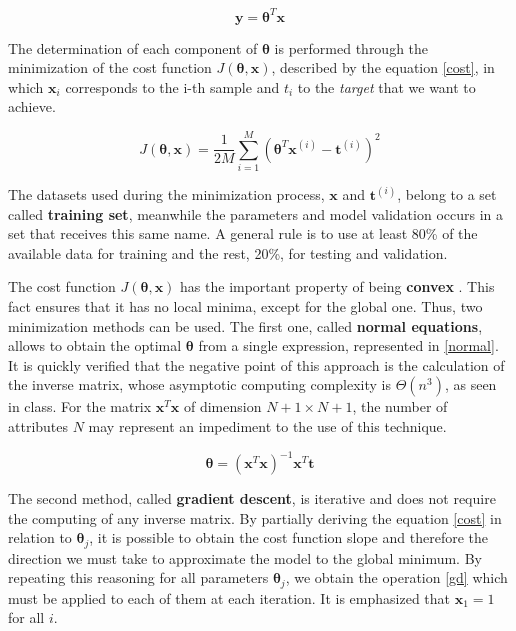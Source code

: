 \documentclass[10pt,twocolumn,letterpaper]{article}
\begin{document}
\begin{equation}
\label {lr}
\bm{y} = \bm{\theta}^T\bm{x}
\end{equation}

The determination of each component of \(\bm{\theta}\) is performed through the minimization of the cost function \(J(\bm{\theta}, \bm{x})\), described by the equation \ref{cost}, in which \(\bm{x}_ i\) corresponds to the i-th sample and \(t_ i\) to the \textit{target} that we want to achieve.

\begin{equation}
\label {cost}
J(\bm{\theta}, \bm{x}) = \frac{1}{2M} \displaystyle\sum_{i=1}^{M} \left(\bm{\theta}^T\bm{x}^{(i)} - \bm{t}^{(i)}\right)^2
\end{equation}

The datasets used during the minimization process,  \(\bm{x}\) and \(\bm{t}^{(i)}\), belong to a set called \textbf{training set}, meanwhile the parameters and model validation occurs in a set that receives this same name. A general rule is to use at least 80\% of the available data for training and the rest, 20\%, for testing and validation.

The cost function \(J(\bm{\theta}, \bm{x})\) has the important property of being  \textbf{convex} \cite{Bishop:2006:PRM:1162264}. This fact ensures that it has no local minima, except for the global one. Thus, two minimization methods can be used. The first one, called \textbf{normal equations},  allows to obtain the optimal \(\bm{\theta}\)  from a single expression, represented in \ref{normal}. It is quickly verified that the negative point of this approach is the calculation of the inverse matrix, whose asymptotic computing complexity is \(\Theta(n^3)\), as seen in class. For the matrix \(\bm{x}^T\bm{x}\) of dimension \(N+1 \times N+1 \), the number of attributes \(N\) may represent an impediment to the use of this technique.

\begin{equation}
\label {normal}
\bm{\theta} = \left(\bm{x}^T\bm{x}\right)^{-1} \bm{x}^T \bm{t}
\end{equation}

The second method, called \textbf {gradient descent}, is iterative and does not require the computing of any inverse matrix. By partially deriving the equation \ref{cost} in relation to \(\bm{\theta}_j\), it is possible to obtain the cost function slope and therefore the direction we must take to approximate the model to the global minimum. By repeating this reasoning for all parameters \(\bm{\theta}_j\), we obtain the operation \ref{gd} which must be applied to each of them at each iteration. It is emphasized that \(\bm{x}_1 = 1\) for all \(i\).
\end{document}

